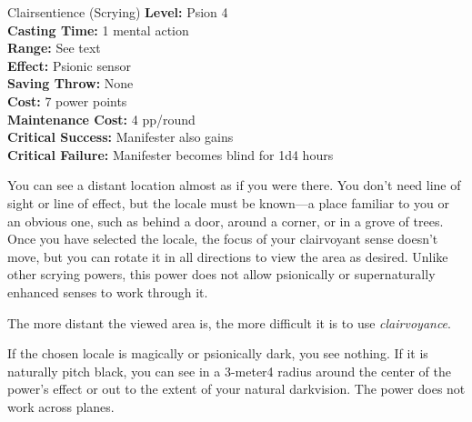 {Clairsentience (Scrying)}
{
	\textbf{Level:}
	Psion 4\\
	\textbf{Casting Time:}
	1 mental action\\
	\textbf{Range:}
	See text\\
	\textbf{Effect:}
	Psionic sensor\\
	\textbf{Saving Throw:}
	None\\
	\textbf{Cost:}
	7 power points\\
	\textbf{Maintenance Cost:}
	4 pp/round\\
	\textbf{Critical Success:}
	Manifester also gains \\
	\textbf{Critical Failure:}
	Manifester becomes blind for 1d4 hours\\
}
{
	You can see a distant location almost as if you were there. You don't need line of sight or line of effect, but the locale must be known---a place familiar to you or an obvious one, such as behind a door, around a corner, or in a grove of trees. Once you have selected the locale, the focus of your clairvoyant sense doesn't move, but you can rotate it in all directions to view the area as desired. Unlike other scrying powers, this power does not allow psionically or supernaturally enhanced senses to work through it.

	The more distant the viewed area is, the more difficult it is to use \emph{clairvoyance}.


	If the chosen locale is magically or psionically dark, you see nothing. If it is naturally pitch black, you can see in a 3-meter4 radius around the center of the power's effect or out to the extent of your natural darkvision. The power does not work across planes. 
}